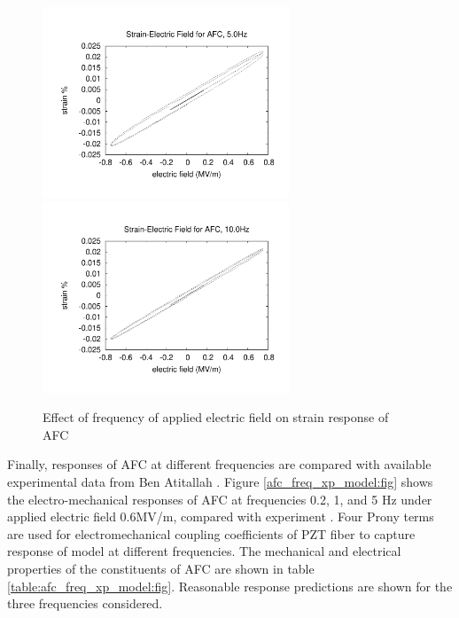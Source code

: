 \begin{figure}
{\includegraphics[width=2.9in]{./chap_4_structural_analyses/afc_unit_cell/frequency_effect/electric_field_vs_strains_freq_5p0}}
{\includegraphics[width=2.9in]{./chap_4_structural_analyses/afc_unit_cell/frequency_effect/electric_field_vs_strains_freq_10p0}}
\caption{Effect of frequency of applied electric field on strain response of AFC}
\label{fig:afc_Frequency_Effect}
\end{figure}






Finally, responses of AFC at different frequencies are compared with available experimental data from Ben Atitallah \cite{atillah2014}. Figure \ref{afc_freq_xp_model:fig} shows the electro-mechanical responses of AFC at frequencies 0.2, 1, and 5 Hz under  applied electric field 0.6MV/m, compared with experiment \cite{atillah2014}. Four Prony terms are used for electromechanical coupling coefficients of PZT fiber to capture response of model at different frequencies. 
The mechanical and electrical properties of the constituents of AFC are shown in table \ref{table:afc_freq_xp_model:fig}. Reasonable response predictions are shown for the three frequencies considered. 



